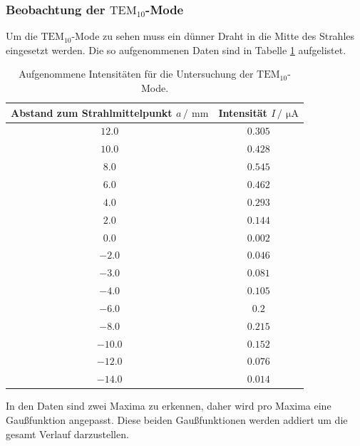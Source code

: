 \subsubsection{Beobachtung der \texorpdfstring{$\text{TEM}_{10}$}{T1}-Mode}
Um die $\text{TEM}_{10}$-Mode zu sehen muss ein dünner Draht in die Mitte des Strahles eingesetzt werden. Die 
so aufgenommenen Daten sind in Tabelle \ref{tab:TEM01} aufgelistet.
\begin{table}
  \centering
  \caption{Aufgenommene Intensitäten für die Untersuchung der $\text{TEM}_{10}$-Mode.}
  \label{tab:TEM01}
  \begin{tabular}{c c}
    \toprule
    Abstand zum Strahlmittelpunkt $a\,/\,\SI{}{\milli\meter}$&Intensität $I \,/\,\SI{}{\micro\ampere}$\\
    \midrule
    $\num{12.0}$&$\num{0.305}$\\
    $\num{10.0}$&$\num{0.428}$\\
    $\num{8.0}$&$\num{0.545}$\\
    $\num{6.0}$&$\num{0.462}$\\
    $\num{4.0}$&$\num{0.293}$\\
    $\num{2.0}$&$\num{0.144}$\\
    $\num{0.0}$&$\num{0.002}$\\
    $\num{-2.0}$&$\num{0.046}$\\
    $\num{-3.0}$&$\num{0.081}$\\
    $\num{-4.0}$&$\num{0.105}$\\
    $\num{-6.0}$&$\num{0.2}$\\
    $\num{-8.0}$&$\num{0.215}$\\
    $\num{-10.0}$&$\num{0.152}$\\
    $\num{-12.0}$&$\num{0.076}$\\
    $\num{-14.0}$&$\num{0.014}$\\
    \bottomrule
  \end{tabular}
\end{table}
\FloatBarrier
In den Daten sind zwei Maxima zu erkennen, daher wird pro Maxima eine Gaußfunktion angepasst. Diese beiden Gaußfunktionen werden
addiert um die gesamt Verlauf darzustellen.
\FloatBarrier
